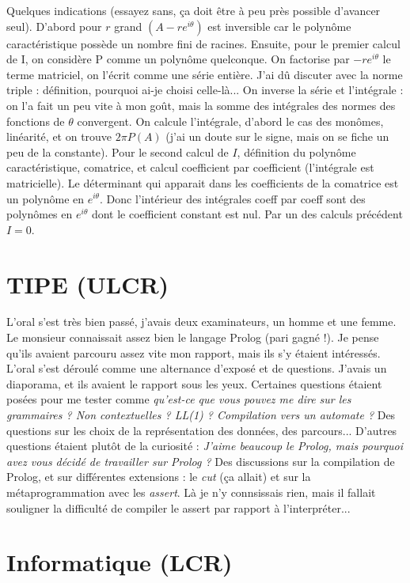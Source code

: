 \documentclass[french,a4paper, 12pt]{article}
\begin{document}
Quelques indications (essayez sans, ça doit être à peu près possible d'avancer seul). D'abord pour $r$ grand $(A - re^{i\theta})$ est inversible car le polynôme caractéristique possède un nombre fini de racines. Ensuite, pour le premier calcul de I, on considère P comme un polynôme quelconque. On factorise par $-re^{i\theta}$ le terme matriciel, on l'écrit comme une série entière. J'ai dû discuter avec la norme triple : définition, pourquoi ai-je choisi celle-là... On inverse la série et l'intégrale : on l'a fait un peu vite à mon goût, mais la somme des intégrales des normes des fonctions de $\theta$ convergent. On calcule l'intégrale, d'abord le cas des monômes, linéarité, et on trouve $2\pi P(A)$ (j'ai un doute sur le signe, mais on se fiche un peu de la constante). Pour le second calcul de $I$, définition du polynôme caractéristique, comatrice, et calcul coefficient par coefficient (l'intégrale est matricielle). Le déterminant qui apparait dans les coefficients de la comatrice est un polynôme en $e^{i\theta}$. Donc l'intérieur des intégrales coeff par coeff sont des polynômes en $e^{i\theta}$ dont le coefficient constant est nul. Par un des calculs précédent $I = 0$.

\section*{TIPE (ULCR)}

L'oral s'est très bien passé, j'avais deux examinateurs, un homme et une femme. Le monsieur connaissait assez bien le langage Prolog (pari gagné !). Je pense qu'ils avaient parcouru assez vite mon rapport, mais ils s'y étaient intéressés. L'oral s'est déroulé comme une alternance d'exposé et de questions. J'avais un diaporama, et ils avaient le rapport sous les yeux. Certaines questions étaient posées pour me tester comme \emph{qu'est-ce que vous pouvez me dire sur les grammaires ? Non contextuelles ? LL(1) ? Compilation vers un automate ?} Des questions sur les choix de la représentation des données, des parcours... D'autres questions étaient plutôt de la curiosité : \emph{J'aime beaucoup le Prolog, mais pourquoi avez vous décidé de travailler sur Prolog ?} Des discussions sur la compilation de Prolog, et sur différentes extensions : le \emph{cut} (ça allait) et sur la métaprogrammation avec les \emph{assert}. Là je n'y connsissais rien, mais il fallait souligner la difficulté de compiler le assert par rapport à l'interpréter...

\section*{Informatique (LCR)}
\end{document}
